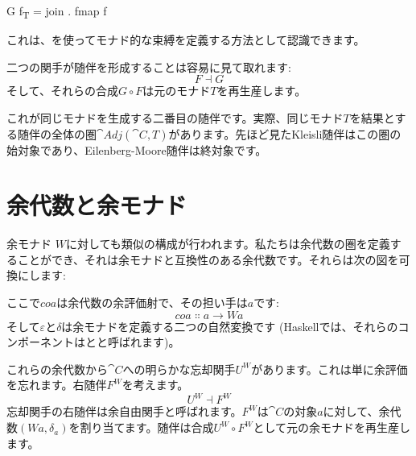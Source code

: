 \begin{snipv}
G f\textsubscript{T} = join . fmap f
\end{snipv}
これは、を使ってモナド的な束縛を定義する方法として認識できます。

二つの関手が随伴を形成することは容易に見て取れます: 
\[F \dashv G\]
そして、それらの合成$G \circ F$は元のモナド$T$を再生産します。

これが同じモナドを生成する二番目の随伴です。実際、同じモナド$T$を結果とする随伴の全体の圏$\cat{Adj}(\cat{C}, T)$があります。先ほど見たKleisli随伴はこの圏の始対象であり、Eilenberg-Moore随伴は終対象です。

\section{余代数と余モナド}

余モナド
$W$に対しても類似の構成が行われます。私たちは余代数の圏を定義することができ、それは余モナドと互換性のある余代数です。それらは次の図を可換にします: 

\begin{figure}[H]
  \centering
  \begin{subfigure}
    \centering
  \end{subfigure}%
  \hspace{1cm}
  \begin{subfigure}
    \centering
  \end{subfigure}
\end{figure}

\noindent
ここで$\mathit{coa}$は余代数の余評価射で、その担い手は$a$です: 
\[\mathit{coa} \Colon a \to W a\]
そして$\varepsilon$と$\delta$は余モナドを定義する二つの自然変換です (Haskellでは、それらのコンポーネントはとと呼ばれます)。

これらの余代数から$\cat{C}$への明らかな忘却関手$U^W$があります。これは単に余評価を忘れます。右随伴$F^W$を考えます。
\[U^W \dashv F^W\]
忘却関手の右随伴は余自由関手と呼ばれます。$F^W$は$\cat{C}$の対象$a$に対して、余代数$(W a, \delta_a)$を割り当てます。随伴は合成$U^W \circ F^W$として元の余モナドを再生産します。

